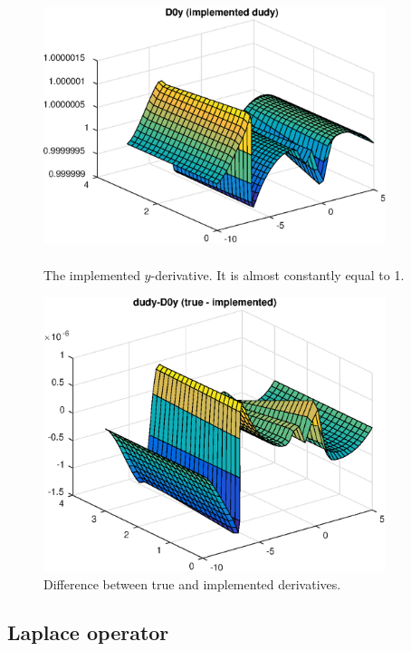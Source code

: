 \documentclass[a4paper,10pt]{article}
\begin{document}
\begin{figure}[ht]
  \centering
  \includegraphics[width = 10cm, height = 8cm]{D0y}
  \begin{minipage}[t]{100mm}
    \caption{
      The implemented $y$-derivative. It is almost constantly equal to 1.
    }\label{FIG_jjj}
  \end{minipage}
\end{figure}



\begin{figure}[ht]
  \centering
  \includegraphics[width = 10cm, height = 8cm]{dudyD0y}
  \begin{minipage}[t]{100mm}
    \caption{
      Difference between true and implemented derivatives.
    }\label{FIG_jjj}
  \end{minipage}
\end{figure}

\FloatBarrier

\subsection*{Laplace operator}
\end{document}
